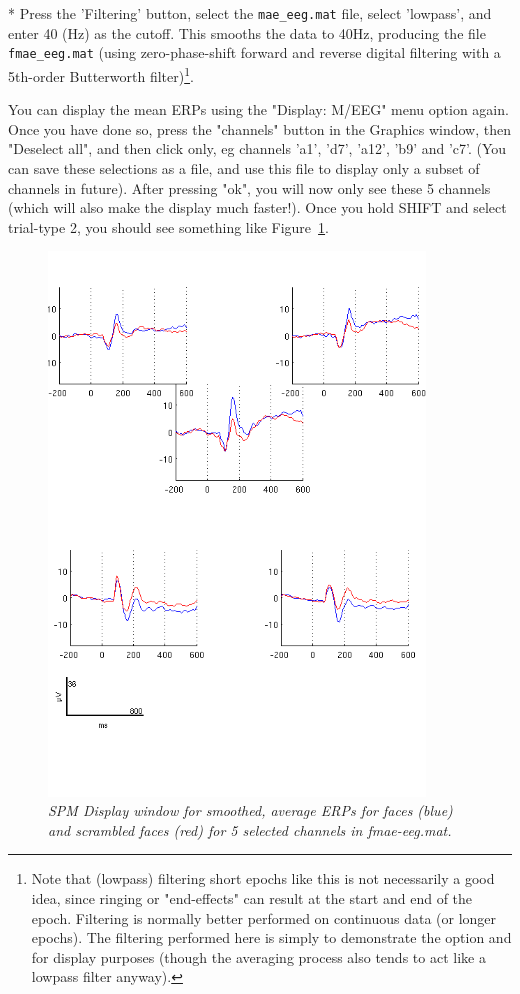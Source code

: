 * Press the 'Filtering' button, select the \verb!mae_eeg.mat! file, select 'lowpass', and enter 40 (Hz) as the cutoff. This smooths the data to 40Hz, producing the file \verb!fmae_eeg.mat! (using zero-phase-shift forward and reverse digital filtering with a 5th-order Butterworth filter)\footnote{Note that (lowpass) filtering short epochs like this is not necessarily a good idea, since ringing or "end-effects" can result at the start and end of the epoch. Filtering is normally better performed on continuous data (or longer epochs). The filtering performed here is simply to demonstrate the option and for display purposes (though the averaging process also tends to act like a lowpass filter anyway).}.

You can display the mean ERPs using the "Display: M/EEG" menu option again. Once you have done so, press the "channels" button in the Graphics window, then "Deselect all", and then click only, eg channels 'a1', 'd7', 'a12', 'b9' and 'c7'. (You can save these selections as a file, and use this file to display only a subset of channels in future). After pressing "ok", you will now only see these 5 channels (which will also make the display much faster!). Once you hold SHIFT and select trial-type 2, you should see something like Figure~\ref{fig_32_3}.

\begin{figure}
\begin{center}
\includegraphics[width=100mm]{multimodal/figures/figure_32_3}
\caption{\em SPM Display window for smoothed, average ERPs for faces (blue) and scrambled faces (red) for 5 selected channels in fmae-eeg.mat. \label{fig_32_3}}
\end{center}
\end{figure}

